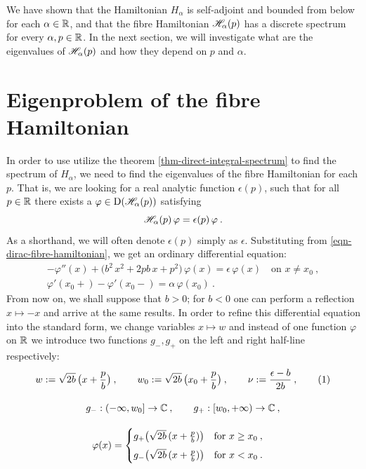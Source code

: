 We have shown that the Hamiltonian $H_\alpha$ is self-adjoint and bounded from below for each $\alpha\in\mathbb{R}$, and that the fibre Hamiltonian $\mathscr{H}_\alpha(p)$ has a discrete spectrum for every $\alpha, p \in \mathbb{R}$. In the next section, we will investigate what are the eigenvalues of $\mathscr{H}_\alpha(p)$ and how they depend on $p$ and $\alpha$.

\section{Eigenproblem of the fibre Hamiltonian} \label{section-dirac-eigenproblem}
In order to use utilize the theorem \ref{thm-direct-integral-spectrum} to find the spectrum of $H_\alpha$, we need to find the eigenvalues of the fibre Hamiltonian for each $p$. That is, we are looking for a real analytic function $\epsilon(p)$, such that for all $p \in \mathbb{R}$ there exists a $\varphi \in \mathrm{D}(\mathscr{H}_\alpha(p))$ satisfying
\begin{equation*}
    \mathscr{H}_\alpha(p) \, \varphi = \epsilon(p) \, \varphi \: .
\end{equation*}
As a shorthand, we will often denote $\epsilon(p)$ simply as $\epsilon$. Substituting from \eqref{eqn-dirac-fibre-hamiltonian}, we get an ordinary differential equation:
\begin{gather*}
    -\varphi''(x)
    + \big( b^2 \, x^2 + 2 p b \, x + p^2 \big) \, \varphi(x)
    = \epsilon \, \varphi(x)
    \quad \text{on } x \neq x_0 \: ,
    \\
    \varphi'(x_0+) - \varphi'(x_0-) = \alpha \, \varphi(x_0)
    \: .
\end{gather*}
From now on, we shall suppose that $b>0$; for $b<0$ one can perform a reflection $x \mapsto -x$ and arrive at the same results. In order to refine this differential equation into the standard form, we change variables $x\mapsto w$ and instead of one function $\varphi$ on $\mathbb{R}$ we introduce two functions $g_-, g_+$ on the left and right half-line respectively:
\begin{gather*}
    w \coloneqq \sqrt{2b} \, \big( x + \frac{p}{b} \big) \: ,
    \qquad
    w_0 \coloneqq \sqrt{2b}\,\big( x_0 + \frac{p}{b} \big) \: ,
    \qquad
    \nu \coloneqq \frac{\epsilon - b}{2b} \: ,
    \numberthis
    \label{eqn-w-nu-definition}
    \\[10pt]
    g_-: (-\infty, w_0] \to \C \: , \qquad
    g_+: [w_0, +\infty) \to \C \: ,
    \\[10pt]
    \varphi(x) = \begin{cases}
        g_+ \big( \sqrt{2b} \, (x + \frac{p}{b}) \big)
        \quad \text{for } x \geq x_0 \: ,
        \\[5pt]
        g_- \big( \sqrt{2b} \, (x + \frac{p}{b}) \big)
        \quad \text{for } x < x_0 \: .
    \end{cases}
\end{gather*}
